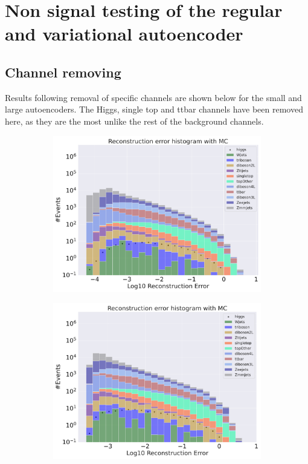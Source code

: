 \section{Non signal testing of the regular and variational autoencoder}\label{sec:nonsig}

\subsection*{Channel removing}

Results following removal of specific channels are shown below for the small and large autoencoders.
The Higgs, single top and ttbar channels have been removed here, as 
they are the most unlike the rest of the background channels. 


\begin{figure}[H]
    \centering
    \begin{subfigure}{.45\textwidth}
        \includegraphics[width=\textwidth]{Figures/AE_testing/small/b_data_recon_big_rm3_feats_sig_higgs.pdf}
        \caption{}
        \label{fig:ae_small_higgs}
    \end{subfigure}
    \hfill 
    \begin{subfigure}{.45\textwidth}
        \includegraphics[width=\textwidth]{Figures/AE_testing/big/b_data_recon_big_rm3_feats_sig_higgs.pdf}

\end{subfigure}
\end{figure}
